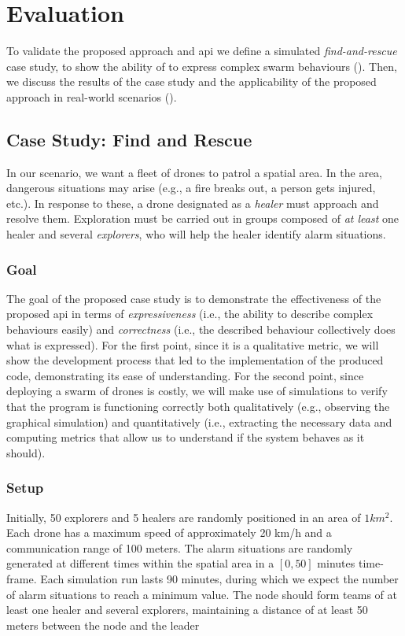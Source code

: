 \section{Evaluation}
\label{coordination2023-macro:sec:eval}

To validate the proposed approach and \ac{api} we define a simulated \emph{find-and-rescue} case study,
to show 
the ability of \MacroSwarm{} to express complex swarm behaviours (). 
Then, we discuss the results of the case study and the applicability of the proposed approach in real-world scenarios ().

\subsection{Case Study: Find and Rescue}\label{coordination2023-macro:subsec:case-study}
In our scenario, we want a fleet of drones to patrol a spatial area.
% 
In the area, dangerous situations may arise (e.g., a fire breaks out, a person gets injured, etc.). 
%
In response to these, a drone designated as a \emph{healer} 
 must approach and resolve them. 
%
Exploration must be carried out in groups composed of \emph{at least} one 
 healer and several \emph{explorers}, who will help the healer identify alarm situations.

\subsubsection{Goal}
The goal of the proposed case study is to demonstrate the effectiveness of the proposed \ac{api} in terms of \emph{expressiveness} 
 (i.e., the ability to describe complex behaviours easily) and 
 \emph{correctness} (i.e., the described behaviour collectively does what is expressed). 
%
For the first point, 
 since it is a qualitative metric, 
 we will show the development process that led to the implementation of the produced code, 
 demonstrating its ease of understanding. 
%
For the second point, 
 since deploying a swarm of drones is costly, 
 we will make use of simulations to verify that the program is functioning correctly both qualitatively 
 (e.g., observing the graphical simulation) 
 and quantitatively 
 (i.e., extracting the necessary data and computing metrics that allow us to understand if the system behaves as it should).
%
\subsubsection{Setup}
Initially, 50 explorers and 5 healers are randomly positioned in an area of $1 km^2$. 
 Each drone has a maximum speed of approximately 20 km/h and a communication range of 100 meters.
%
The alarm situations are randomly generated at different times
 within the spatial area in a $[0,50]$ minutes time-frame. 
%
%
Each simulation run lasts 90 minutes, 
 during which we expect the number of alarm situations to reach a minimum value.
The node should form teams of at least one healer and several explorers, maintaining a distance of at least 50 meters between the node and the leader
